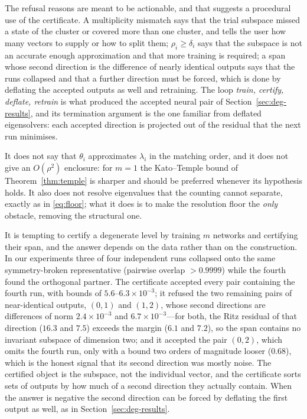 The refusal reasons are meant to be actionable, and that suggests a
procedural use of the certificate. A multiplicity mismatch says that the trial
subspace missed a state of the cluster or covered more than one cluster, and
tells the user how many vectors to supply or how to split them;
$\rho_i\ge\delta_i$ says that the subspace is not an accurate enough
approximation and that more training is required; a span whose second
direction is the difference of nearly identical outputs says that the runs
collapsed and that a further direction must be forced, which is done by
deflating the accepted outputs as well and retraining. The loop
\emph{train, certify, deflate, retrain} is what produced the accepted neural
pair of Section~\ref{sec:deg-results}, and its termination argument is the one
familiar from deflated eigensolvers: each accepted direction is projected out
of the residual that the next run minimises.

\begin{remark}
\label{rem:cluster-not}
It does not say that $\theta_i$ approximates $\lambda_i$ in the matching
order, and it does not give an $O(\rho^2)$ enclosure: for $m=1$ the
Kato--Temple bound of Theorem~\ref{thm:temple} is sharper and should be
preferred whenever its hypothesis holds. It also does not resolve eigenvalues
that the counting cannot separate, exactly as in \eqref{eq:floor}; what it
does is to make the resolution floor the \emph{only} obstacle, removing the
structural one.
\end{remark}

\begin{remark}\label{rem:two}
It is tempting to certify a degenerate level by training $m$ networks and
certifying their span, and the answer depends on the data rather than on the
construction. In our experiments three of four independent runs collapsed onto
the same symmetry-broken representative (pairwise overlap $>0.9999$) while the
fourth found the orthogonal partner. The certificate accepted every pair
containing the fourth run, with bounds of $5.6$--$6.3\times10^{-3}$; it refused
the two remaining pairs of near-identical outputs, $(0,1)$ and $(1,2)$, whose
second directions are differences of norm $2.4\times10^{-3}$ and
$6.7\times10^{-3}$---for both, the Ritz residual of that direction ($16.3$ and
$7.5$) exceeds the margin ($6.1$ and $7.2$), so the span contains no invariant
subspace of dimension two; and it accepted the pair $(0,2)$, which omits the
fourth run, only with a bound two orders of magnitude looser ($0.68$), which
is the honest signal that its second direction was mostly noise. The certified
object is the subspace, not the individual vector, and the certificate sorts
sets of outputs by how much of a second direction they actually contain. When the answer is negative the
second direction can be forced by deflating the first output as well, as in
Section~\ref{sec:deg-results}.
\end{remark}
